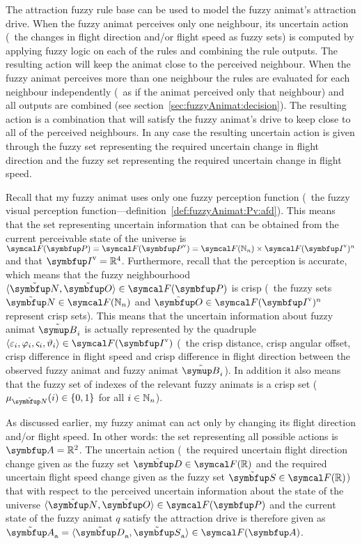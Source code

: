 The attraction fuzzy rule base can be used to model the fuzzy animat's attraction drive. When the fuzzy animat perceives only one neighbour, its uncertain action (\ie\ the changes in flight direction and/or flight speed as fuzzy sets) is computed by applying fuzzy logic on each of the rules and combining the rule outputs. The resulting action will keep the animat close to the perceived neighbour. When the fuzzy animat perceives more than one neighbour the rules are evaluated for each neighbour independently (\ie\ as if the animat perceived only that neighbour) and all outputs are combined (see section~\ref{sec:fuzzyAnimat:decision}). The resulting action is a combination that will satisfy the fuzzy animat's drive to keep close to all of the perceived neighbours. In any case the resulting uncertain action is given through the fuzzy set representing the required uncertain change in flight direction and the fuzzy set representing the required uncertain change in flight speed.

Recall that my fuzzy animat uses only one fuzzy perception function (\ie\ the fuzzy visual perception function---definition~\ref{def:fuzzyAnimat:Pv:afd}). This means that the set representing uncertain information that can be obtained from the current perceivable state of the universe is $\fpowset{\set{P}}=\fpowset{\set{P}^\textnormal{v}}=\fpowset{\N_n} \times \fpowset{\set{I}^\textnormal{v}}^n$ and that $\set{I}^\textnormal{v}=\R^4$. Furthermore, recall that the perception is accurate, which means that the fuzzy neighbourhood $\langle \fset{N}, \fset{O} \rangle \in \fpowset{\set{P}}$ is crisp (\ie\ the fuzzy sets $\fset{N} \in \fpowset{\N_n}$ and $\fset{O} \in \fpowset{\set{I}^\textnormal{v}}^n$ represent crisp sets). This means that the uncertain information about fuzzy animat $\fautom{B}_i$ is actually represented by the quadruple $\langle \varepsilon_i, \varphi_i, \varsigma_i, \vartheta_i \rangle \in \fpowset{\set{I}^\textnormal{v}}$ (\ie\ the crisp distance, crisp angular offset, crisp difference in flight speed and crisp difference in flight direction between the observed fuzzy animat and fuzzy animat $\fautom{B}_i$). In addition it also means that the fuzzy set of indexes of the relevant fuzzy animats is a crisp set (\ie\ $\mu_\fset{N}(i) \in \left\{0,1\right\}$ for all $i \in \mathbb{N}_n$). 

As discussed earlier, my fuzzy animat can act only by changing its flight direction and/or flight speed. In other words: the set representing all possible actions is $\set{A}=\R^2$. The uncertain action (\ie\ the required uncertain flight direction change given as the fuzzy set $\fset{D} \in \fpowset{\R}$ and the required uncertain flight speed change given as the fuzzy set $\fset{S} \in \fpowset{\R}$) that with respect to the perceived uncertain information about the state of the universe $\langle \fset{N}, \fset{O} \rangle \in \fpowset{\set{P}}$ and the current state of the fuzzy animat $q$ satisfy the attraction drive is therefore given as $\fset{A}_\textnormal{a}=\langle \fset{D}_\textnormal{a}, \fset{S}_\textnormal{a} \rangle \in \fpowset{\set{A}}$.

